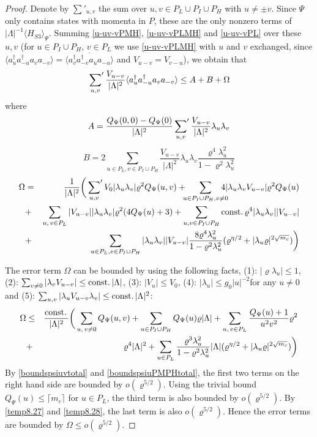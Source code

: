 \documentclass[11pt]{article}
\numberwithin{equation}{section}
\newcommand{\beq}{\begin{equation}}
\newcommand{\eeq}{\end{equation}}
\newcommand{\beqa}{\begin{eqnarray}}
\newcommand{\eeqa}{\end{eqnarray}}
\newcommand\const{{\rm const.\, }}
\renewcommand\rho\varrho
\theoremstyle{definition}
\begin{document}
\begin{proof}
Denote by $\sum'_{u,v}$ the sum over $u,v\in P_L\cup P_I\cup P_H$ with $u\neq\pm v$. Since $\Psi$ only contains states with momenta in $P$, these are the only nonzero terms of $|\Lambda|^{-1}\langle H_{S3}\rangle_\Psi$.
Summing  \eqref{u-uv-vPMH}, \eqref{u-uv-vPLMH} and \eqref{u-uv-vPL} over these $u,v$ (for $u\in P_I\cup P_H$, $v\in P_L$ we use \eqref{u-uv-vPLMH} with $u$ and $v$ exchanged, since $\langle a^\dagger_ua^\dagger_{-u}a_va_{-v}\rangle=\overline{\langle a^\dagger_va^\dagger_{-v}a_ua_{-u}\rangle}$ and $V_{u-v}=V_{v-u}$), we obtain that
\beq
\sideset{}{'}\sum_{u,v}
\frac{V_{u-v}}{|\Lambda|^2}\langle a^\dagger_ua^\dagger_{-u}a_va_{-v}\rangle
\le A+ B + \Omega
\eeq
where
\[
A= \frac{Q_\Psi(0,0)-Q_\Psi(0)}{|\Lambda|^2}  \sideset{}{'}\sum_{u,v}\frac{V_{u-v}}{|\Lambda|^2}\lambda_u\lambda_v
\]
\[
B= 2\sum_{u\in P_L,v\in P_I\cup P_H}\frac{V_{u-v}}{|\Lambda|^2}\lambda_u\lambda_v\frac{\rho^4\lambda_u^2}{1-\rho^2\lambda_u^2}
\]
\beqa\label{longexpression1}
\Omega &= &\frac{1}{|\Lambda|^2}\bigg(\sideset{}{'}\sum_{u,v}V_0|\lambda_u\lambda_v|\rho^2Q_\Psi(u,v)+\!\!\!\sum_{u\in P_I\cup P_H,v\neq 0}\!\!\!\!\!\!4|\lambda_u\lambda_vV_{u-v}|\rho^2Q_\Psi(u)\nonumber \\
&+&\sum_{u,\,v\in P_L}|V_{u-v}||\lambda_u\lambda_v|\rho^2(4Q_\Psi(u)+3)+\sum_{u,v\in P_I\cup P_H}\const\rho^4|\lambda_u\lambda_v||V_{u-v}|\nonumber \\
&+&\sum_{u\in P_L,v\in P_I\cup P_H}|\lambda_u\lambda_v||V_{u-v}|\frac{8\rho^4\lambda_u^2}{1-\rho^2\lambda_u^2}(\rho^{\eta/2}+|\lambda_u\rho|^{2\sqrt{m_c}})\bigg)
\eeqa

The error term $\Omega$ can be bounded by using  the following facts, (1): $|\rho\lambda_u|\leq 1$, (2): $\sum_{v\neq 0}|\lambda_vV_{u-v}|\leq \const|\Lambda|$, (3): $|V_u|\leq V_0$, (4): $|\lambda_u|\leq g_0|u|^{-2}$for any $u\neq 0$ and (5): $\sum_{u,v}|\lambda_uV_{u-v}\lambda_v|\leq \const |\Lambda|^2$:
\beqa\nonumber
\Omega  &\le & \frac{\const}{|\Lambda|^2}\bigg(\sum_{u,\,v\neq 0}Q_\Psi(u,v)+\sum_{u\in P_I\cup P_H} Q_\Psi(u)\rho|\Lambda|+\sum_{u,\,v\in P_L}\frac{Q_\Psi(u)+1}{u^2v^2}\rho^2\\\label{temp8.70}
&+&\rho^4|\Lambda|^2+\sum_{u\in P_L}\frac{\rho^3\lambda_u^2}{1-\rho^2\lambda_u^2} |\Lambda| (\rho^{\eta/2}+|\lambda_u\rho|^{2\sqrt{m_c}})\bigg)
\eeqa
By  \eqref{boundspsiuvtotal} and \eqref{boundspsiuPMPHtotal}, the first two terms on the right hand side
are bounded by $o(\rho^{5/2})$. Using the trivial bound  $Q_\Psi(u)\leq \lceil m_c\rceil$ for $u\in P_L$,
the third term is also bounded by $o(\rho^{5/2})$. By  \eqref{temp8.27} and \eqref{temp8.28}, the last term is also $o(\rho^{5/2})$.  Hence the error terms are bounded by $\Omega \leq o(\rho^{5/2})$. 



\end{proof}
\end{document}
